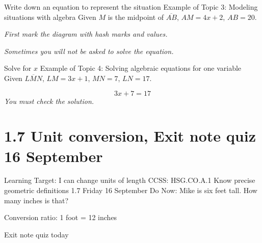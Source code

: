 \begin{frame}{Write down an equation to represent the situation}
  {Example of Topic 3: Modeling situations with algebra}
  Given $M$ is the midpoint of $\overline{AB}$, $AM=4x+2$, $AB=20$. \par  \vspace{0.5cm}
  \emph{First mark the diagram with hash marks and values.} \vspace{1cm}
    \begin{center}
    \end{center} \vspace{2cm}
  \emph{Sometimes you will not be asked to solve the equation.}
\end{frame}

\begin{frame}{Solve for $x$}
  {Example of Topic 4: Solving algebraic equations for one variable}
  Given $\overline{LMN}$, $LM=3x+1$, $MN=7$, $LN=17$.
    \begin{flushleft}
    \end{flushleft} \vspace{1cm}
  \large \[ 3x+7=17 \]  \vspace{1cm}
  \emph{You must check the solution.}
\end{frame}

\section{1.7 Unit conversion, Exit note quiz \hfill 16 September}
\begin{frame}{Learning Target: I can change units of length}
  {CCSS: HSG.CO.A.1 Know precise geometric definitions  \hfill \alert{1.7 Friday 16 September}}
  Do Now: Mike is six feet tall. How many inches is that? \par \vspace{0.25cm}
  Conversion ratio: 1 foot = 12 inches \par
  \vspace{3cm}
  \alert{Exit note quiz today}
\end{frame}

